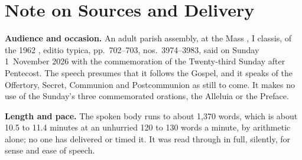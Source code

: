 
\section*{Note on Sources and Delivery}

{\footnotesize

\textbf{Audience and occasion.} An adult parish assembly, at the Mass
, I classis, of the 1962 , editio typica, pp.~702--703, nos.~3974--3983, said on Sunday
1~November 2026 with the commemoration of the Twenty-third Sunday after
Pentecost. The speech presumes that it follows the Gospel, and it speaks of
the Offertory, Secret, Communion and Postcommunion as still to come. It makes
no use of the Sunday's three commemorated orations, the Alleluia or the
Preface.

\textbf{Length and pace.} The spoken body runs to about 1,370 words, which is
about 10.5 to 11.4 minutes at an unhurried 120 to 130 words a minute, by
arithmetic alone; no one has delivered or timed it. It was read through in
full, silently, for sense and ease of speech.

}

